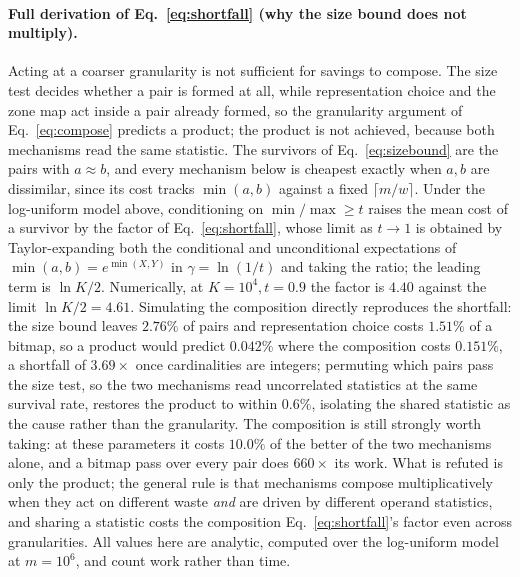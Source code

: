 \paragraph*{Full derivation of Eq.~\eqref{eq:shortfall} (why the size bound does not multiply).}
Acting at a coarser granularity is not sufficient for savings to compose. The size test decides
whether a pair is formed at all, while representation choice and the zone map act inside a pair already
formed, so the granularity argument of Eq.~\eqref{eq:compose} predicts a product; the product is not
achieved, because both mechanisms read the same statistic. The survivors of Eq.~\eqref{eq:sizebound}
are the pairs with $a\approx b$, and every mechanism below is cheapest exactly when $a,b$ are
dissimilar, since its cost tracks $\min(a,b)$ against a fixed $\lceil m/w\rceil$. Under the log-uniform
model above, conditioning on $\min/\max\ge t$ raises the mean cost of a survivor by the factor of
Eq.~\eqref{eq:shortfall}, whose limit as $t\to1$ is obtained by Taylor-expanding both the conditional
and unconditional expectations of $\min(a,b)=e^{\min(X,Y)}$ in $\gamma=\ln(1/t)$ and taking the ratio;
the leading term is $\ln K/2$. Numerically, at $K=10^4,t=0.9$ the factor is $4.40$ against the limit
$\ln K/2=4.61$. Simulating the composition directly reproduces the shortfall: the size bound leaves
$2.76\%$ of pairs and representation choice costs $1.51\%$ of a bitmap, so a product would predict
$0.042\%$ where the composition costs $0.151\%$, a shortfall of $3.69\times$ once
cardinalities are integers; permuting which pairs pass the size test, so the two mechanisms read
uncorrelated statistics at the same survival rate, restores the product to within $0.6\%$, isolating
the shared statistic as the cause rather than the granularity. The composition is still strongly worth
taking: at these parameters it costs $10.0\%$ of the better of the two mechanisms alone, and a bitmap
pass over every pair does $660\times$ its work. What is refuted is only the product; the general rule
is that mechanisms compose multiplicatively when they act on different waste \emph{and} are driven by
different operand statistics, and sharing a statistic costs the composition
Eq.~\eqref{eq:shortfall}'s factor even across granularities. All values here are analytic, computed
over the log-uniform model at $m=10^6$, and count work rather than time.

\label{note:proofs-choice}

